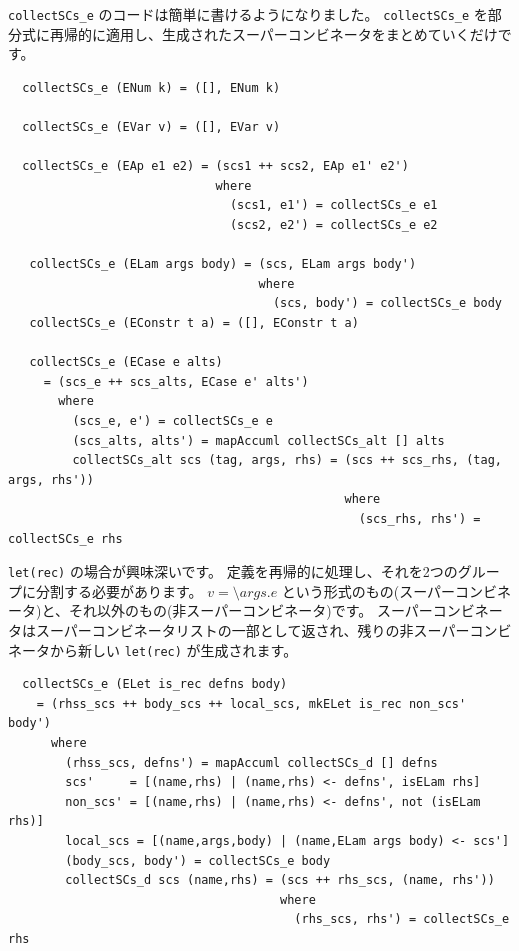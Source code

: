 \documentclass{jbook}
\begin{document}
\texttt{collectSCs\_e} のコードは簡単に書けるようになりました。
\texttt{collectSCs\_e} を部分式に再帰的に適用し、生成されたスーパーコンビネータをまとめていくだけです。

\begin{verbatim}
  collectSCs_e (ENum k) = ([], ENum k)

  collectSCs_e (EVar v) = ([], EVar v)

  collectSCs_e (EAp e1 e2) = (scs1 ++ scs2, EAp e1' e2')
                             where
                               (scs1, e1') = collectSCs_e e1
                               (scs2, e2') = collectSCs_e e2

   collectSCs_e (ELam args body) = (scs, ELam args body')
                                   where
                                     (scs, body') = collectSCs_e body
   collectSCs_e (EConstr t a) = ([], EConstr t a)

   collectSCs_e (ECase e alts)
     = (scs_e ++ scs_alts, ECase e' alts')
       where
         (scs_e, e') = collectSCs_e e
         (scs_alts, alts') = mapAccuml collectSCs_alt [] alts
         collectSCs_alt scs (tag, args, rhs) = (scs ++ scs_rhs, (tag, args, rhs'))
                                               where
                                                 (scs_rhs, rhs') = collectSCs_e rhs
\end{verbatim}

\texttt{let(rec)} の場合が興味深いです。
定義を再帰的に処理し、それを2つのグループに分割する必要があります。
$v = \texttt{\textbackslash} args \texttt{.} e$ という形式のもの(スーパーコンビネータ)と、それ以外のもの(非スーパーコンビネータ)です。
スーパーコンビネータはスーパーコンビネータリストの一部として返され、残りの非スーパーコンビネータから新しい \texttt{let(rec)} が生成されます。

\begin{verbatim}
  collectSCs_e (ELet is_rec defns body)
    = (rhss_scs ++ body_scs ++ local_scs, mkELet is_rec non_scs' body')
      where
        (rhss_scs, defns') = mapAccuml collectSCs_d [] defns
        scs'     = [(name,rhs) | (name,rhs) <- defns', isELam rhs]
        non_scs' = [(name,rhs) | (name,rhs) <- defns', not (isELam rhs)]
        local_scs = [(name,args,body) | (name,ELam args body) <- scs']
        (body_scs, body') = collectSCs_e body
        collectSCs_d scs (name,rhs) = (scs ++ rhs_scs, (name, rhs'))
                                      where
                                        (rhs_scs, rhs') = collectSCs_e rhs
\end{verbatim}
\end{document}
